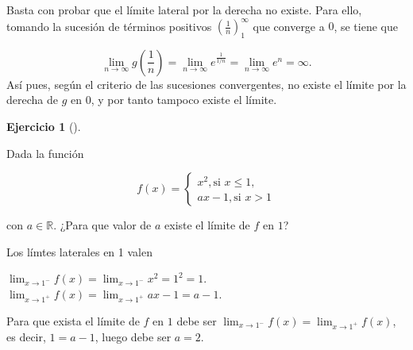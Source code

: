 \documentclass[
  spanish,
  a4paper,
]{scrreport}
\theoremstyle{definition}
\newtheorem{exercise}{Ejercicio}[chapter]
\theoremstyle{remark}
\begin{document}
\begin{tcolorbox}[enhanced jigsaw, arc=.35mm, bottomrule=.15mm, bottomtitle=1mm, breakable, colback=white, colbacktitle=quarto-callout-tip-color!10!white, colframe=quarto-callout-tip-color-frame, coltitle=black, left=2mm, leftrule=.75mm, opacityback=0, opacitybacktitle=0.6, rightrule=.15mm, title=\textcolor{quarto-callout-tip-color}{\faLightbulb}\hspace{0.5em}{Solución}, titlerule=0mm, toprule=.15mm, toptitle=1mm]

Basta con probar que el límite lateral por la derecha no existe. Para
ello, tomando la sucesión de términos positivos
\(\left(\frac{1}{n}\right)_1^\infty\) que converge a \(0\), se tiene que

\[
\lim_{n\to\infty}g\left(\frac{1}{n}\right) = \lim_{n\to\infty}e^{\frac{1}{1/n}} =  \lim_{n\to\infty}e^n = \infty.
\] Así pues, según el criterio de las sucesiones convergentes, no existe
el límite por la derecha de \(g\) en \(0\), y por tanto tampoco existe
el límite.

\end{tcolorbox}

\begin{exercise}[]\protect\hypertarget{exr-limites-laterales}{}\label{exr-limites-laterales}

Dada la función

\[
f(x)=\begin{cases}
x^2, \mbox{si } x\leq 1,\\ 
ax-1, \mbox{si } x>1
\end{cases}
\]

con \(a\in\mathbb{R}\). ¿Para que valor de \(a\) existe el límite de
\(f\) en \(1\)?

\end{exercise}

\begin{tcolorbox}[enhanced jigsaw, arc=.35mm, bottomrule=.15mm, bottomtitle=1mm, breakable, colback=white, colbacktitle=quarto-callout-tip-color!10!white, colframe=quarto-callout-tip-color-frame, coltitle=black, left=2mm, leftrule=.75mm, opacityback=0, opacitybacktitle=0.6, rightrule=.15mm, title=\textcolor{quarto-callout-tip-color}{\faLightbulb}\hspace{0.5em}{Solución}, titlerule=0mm, toprule=.15mm, toptitle=1mm]

Los límtes laterales en 1 valen

\(\lim_{x\to 1^-} f(x) = \lim_{x\to 1^-} x^2 = 1^2 = 1.\)
\(\lim_{x\to 1^+} f(x) = \lim_{x\to 1^+} ax-1 = a-1.\)

Para que exista el límite de \(f\) en \(1\) debe ser
\(\lim_{x\to 1^-}f(x)=\lim_{x\to 1^+}f(x)\), es decir, \(1=a-1\), luego
debe ser \(a=2\).

\end{tcolorbox}
\end{document}
